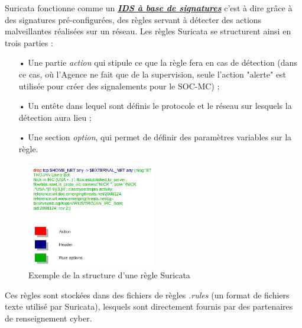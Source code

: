 Suricata fonctionne comme un \hyperref[chap2:IDSsignature]{\textbf{\textit{IDS à base de signatures}}} c'est à dire grâce à des signatures pré-configurées, des règles servant à détecter des actions malveillantes réalisées sur un réseau. Les règles Suricata se structurent ainsi en trois parties :
\vspace{0.5em}
\begin{itemize}[itemsep=0.75em]
    \item[•] Une partie \textit{action} qui stipule ce que la règle fera en cas de détection (dans ce cas, où l'Agence ne fait que de la supervision, seule l'action "alerte" est utilisée pour créer des signalements pour le SOC-MC) ;
    \item[•] Un entête dans lequel sont définis le protocole et le réseau sur lesquels la détection aura lieu ;
    \item[•] Une section \textit{option}, qui permet de définir des paramètres variables sur la règle.\\
\end{itemize}

\begin{figure}[h]%
    \center%
    \includegraphics[width=0.5\textwidth]{assets/intro_sig.png}
    \caption[Exemple de la structure d'une règle Suricata (source: \href{https://redmine.openinfosecfoundation.org/projects/suricata/wiki/Suricata_Rules}{redmine.openinfosecfoundation.org})]{Exemple de la structure d'une règle Suricata}\label{fig:intro_sig}
\end{figure}

\newpage

Ces règles sont stockées dans des fichiers de règles \textit{.rules} (un format de fichiers texte utilisé par Suricata), lesquels sont directement fournis par des partenaires de renseignement cyber.\\

